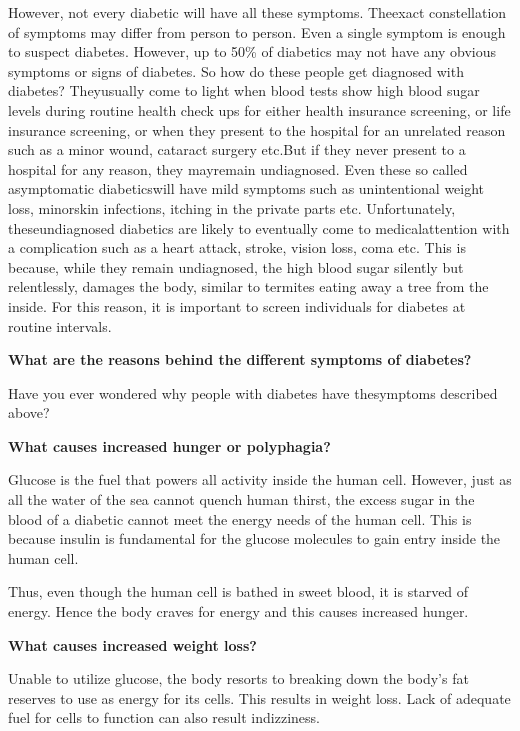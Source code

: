 However, not every diabetic will have all these symptoms. The\break exact constellation of symptoms may differ from person to person. Even a single symptom is enough to suspect diabetes. However, up to 50\% of diabetics may not have any obvious symptoms or signs of diabetes. So how do these people get diagnosed with diabetes? They\break usually come to light when blood tests show high blood sugar levels during routine health check ups for either health insurance scree\-ning, or life insurance screening, or when they present to the hospital for an un\-related reason such as a minor wound, cataract surgery etc.\break But if they never present to a hospital for any reason, they may\break remain undia\-gnosed. Even these so called asymptomatic diabetics\break will have mild symptoms such as unintentional weight loss, minor\break skin infections, itching in the private parts etc. Unfortunately, these\break undiagno\-sed dia\-betics are likely to eventually come to medical\break attention with a compli\-cation such as a heart attack, stroke, vision loss, coma etc. This is because, while they remain undiagnosed, the high blood sugar silently but relentlessly, damages the body, similar to termites eating away a tree from the inside. For this reason, it is important to screen indi\-viduals for diabetes at routine intervals.

\noindent
\textbf{What are the reasons behind the different symptoms of diabetes?}

Have you ever wondered why people with diabetes have the\break symptoms described above?

\noindent
\textbf{What causes increased hunger or polyphagia?}

Glucose is the fuel that powers all activity inside the human cell. However, just as all the water of the sea cannot quench human thirst, the excess sugar in the blood of a diabetic cannot meet the energy needs of the human cell. This is because insulin is fundamental for the glucose molecules to gain entry inside the human cell.

Thus, even though the human cell is bathed in sweet blood, it is starved of energy. Hence the body craves for energy and this causes increased hunger.

\noindent
\textbf{What causes increased weight loss?}

Unable to utilize glucose, the body resorts to breaking down the body’s fat reserves to use as energy for its cells. This results in weight loss. Lack of adequate fuel for cells to function can also result in\break dizziness.

